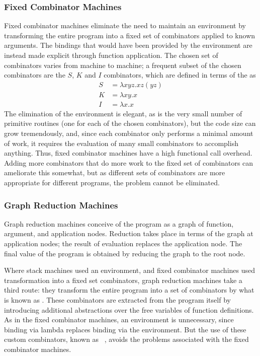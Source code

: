 \subsubsection[Fixed Combinator]{Fixed Combinator Machines}
Fixed combinator machines eliminate the need to maintain an environment by transforming the entire program into a fixed set of combinators applied to known arguments. The bindings that would have been provided by the environment are instead made explicit through function application. The chosen set of combinators varies from machine to machine; a frequent subset of the chosen combinators are the $S$, $K$ and $I$ combinators, which are defined in terms of the \lambdacalc as
\begin{align*}
S &= \lambda xyz. xz (yz)\\
K &= \lambda xy. x\\
I &= \lambda x. x
\end{align*}
The elimination of the environment is elegant, as is the very small number of primitive routines (one for each of the chosen combinators), but the code size can grow tremendously, and, since each combinator only performs a minimal amount of work, it requires the evaluation of many small combinators to accomplish anything. Thus, fixed combinator machines have a high functional call overhead. Adding more combinators that do more work to the fixed set of combinators can ameliorate this somewhat, but as different sets of combinators are more appropriate for different programs, the problem cannot be eliminated.

\subsubsection[Graph Reduction]{Graph Reduction Machines}
Graph reduction machines conceive of the program as a graph of function, argument, and application nodes. Reduction takes place in terms of the graph at application nodes; the result of evaluation replaces the application node. The final value of the program is obtained by reducing the graph to the root node.

Where stack machines used an environment, and fixed combinator machines used transformation into a fixed set combinators, graph reduction machines take a third route: they transform the entire program into a set of combinators by what is known as . These combinators are extracted from the program itself by introducing additional abstractions over the free variables of function definitions. As in the fixed combinator machines, an environment is unnecessary, since binding via lambda replaces binding via the environment. But the use of these custom combinators, known as ~\citep{Hughes:Super-combinators:1982}, avoids the problems associated with the fixed combinator machines.

